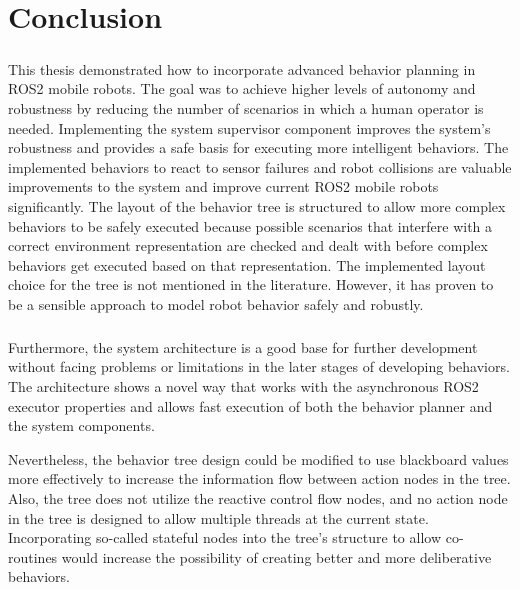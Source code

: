 \chapter{Conclusion}
\label{cha:diskussion}
\paragraph*{}

This thesis demonstrated how to incorporate advanced behavior planning in ROS2 mobile robots. The goal was to achieve higher levels of autonomy and robustness by reducing the number of scenarios in which a human operator is needed. Implementing the system supervisor component improves the system's robustness and provides a safe basis for executing more intelligent behaviors. The implemented behaviors to react to sensor failures and robot collisions are valuable improvements to the system and improve current ROS2 mobile robots significantly. The layout of the behavior tree is structured to allow more complex behaviors to be safely executed because possible scenarios that interfere with a correct environment representation are checked and dealt with before complex behaviors get executed based on that representation. 
The implemented layout choice for the tree is not mentioned in the literature. However, it has proven to be a sensible approach to model robot behavior safely and robustly. 
\paragraph*{}
Furthermore, the system architecture is a good base for further development without facing problems or limitations in the later stages of developing behaviors. The architecture shows a novel way that works with the asynchronous ROS2 executor properties and allows fast execution of both the behavior planner and the system components. 

Nevertheless, the behavior tree design could be modified to use blackboard values more effectively to increase the information flow between action nodes in the tree. Also, the tree does not utilize the reactive control flow nodes, and no action node in the tree is designed to allow multiple threads at the current state. Incorporating so-called stateful nodes into the tree's structure to allow co-routines would increase the possibility of creating better and more deliberative behaviors. 







